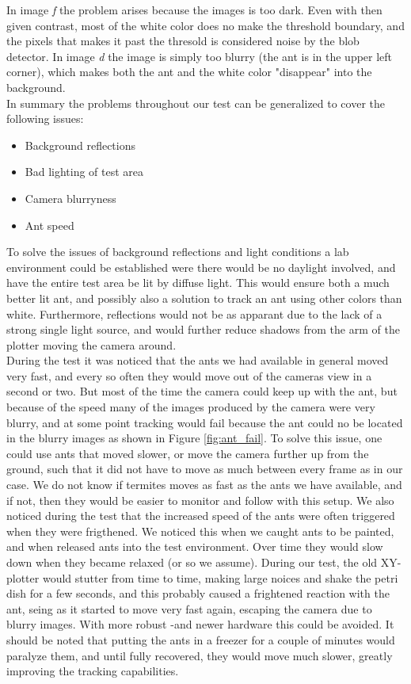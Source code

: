 In image \emph{f} the problem arises because the images is too dark. Even with then given contrast, most of the white color does no make the threshold boundary, and the pixels that makes it past the thresold is considered noise by the blob detector. In image \emph{d} the image is simply too blurry (the ant is in the upper left corner), which makes both the ant and the white color "disappear" into the background.\\

In summary the problems throughout our test can be generalized to cover the following issues:

\begin{itemize}
    \item Background reflections
    \item Bad lighting of test area
    \item Camera blurryness
    \item Ant speed
\end{itemize}

To solve the issues of background reflections and light conditions a lab environment could be established were there would be no daylight involved, and have the entire test area be lit by diffuse light. This would ensure both a much better lit ant, and possibly also a solution to track an ant using other colors than white. Furthermore, reflections would not be as apparant due to the lack of a strong single light source, and would further reduce shadows from the arm of the plotter moving the camera around.\\

During the test it was noticed that the ants we had available in general moved very fast, and every so often they would move out of the cameras view in a second or two. But most of the time the camera could keep up with the ant, but because of the speed many of the images produced by the camera were very blurry, and at some point tracking would fail because the ant could no be located in the blurry images as shown in Figure \ref{fig:ant_fail}. To solve this issue, one could use ants that moved slower, or move the camera further up from the ground, such that it did not have to move as much between every frame as in our case. We do not know if termites moves as fast as the ants we have available, and if not, then they would be easier to monitor and follow with this setup. We also noticed during the test that the increased speed of the ants were often triggered when they were frigthened. We noticed this when we caught ants to be painted, and when released ants into the test environment. Over time they would slow down when they became relaxed (or so we assume). During our test, the old XY-plotter would stutter from time to time, making large noices and shake the petri dish for a few seconds, and this probably caused a frightened reaction with the ant, seing as it started to move very fast again, escaping the camera due to blurry images. With more robust -and newer hardware this could be avoided. It should be noted that putting the ants in a freezer for a couple of minutes would paralyze them, and until fully recovered, they would move much slower, greatly improving the tracking capabilities.\\

